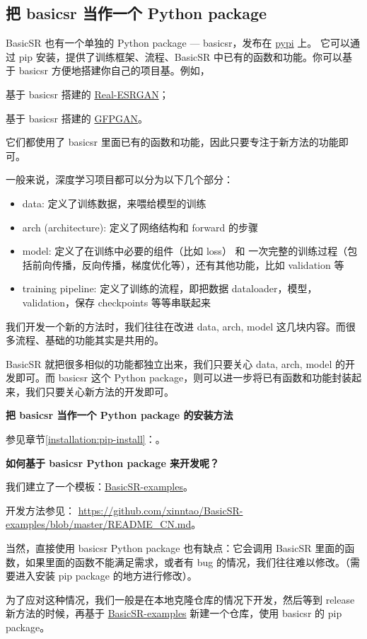 \documentclass[../main.tex]{subfiles}
\begin{document}
\subsection{把 basicsr 当作一个 Python package}\label{overview:package}

BasicSR 也有一个单独的 Python package --- basicsr，发布在 \href{https://pypi.org/project/basicsr}{pypi} 上。
它可以通过 pip 安装，提供了训练框架、流程、BasicSR 中已有的函数和功能。你可以基于 basicsr 方便地搭建你自己的项目基。例如，

\centerline{基于 basicsr 搭建的 \href{https://github.com/xinntao/Real-ESRGAN}{Real-ESRGAN}；}
\centerline{基于 basicsr 搭建的 \href{https://github.com/TencentARC/GFPGAN}{GFPGAN}。}

它们都使用了 basicsr 里面已有的函数和功能，因此只要专注于新方法的功能即可。

一般来说，深度学习项目都可以分为以下几个部分：
\begin{itemize}
    \item data: 定义了训练数据，来喂给模型的训练
    \item arch (architecture): 定义了网络结构和 forward 的步骤
    \item model: 定义了在训练中必要的组件（比如 loss） 和 一次完整的训练过程（包括前向传播，反向传播，梯度优化等），还有其他功能，比如 validation 等
    \item training pipeline: 定义了训练的流程，即把数据 dataloader，模型，validation，保存 checkpoints 等等串联起来
\end{itemize}

我们开发一个新的方法时，我们往往在改进 data, arch, model 这几块内容。而很多流程、基础的功能其实是共用的。

BasicSR 就把很多相似的功能都独立出来，我们只要关心 data, arch, model 的开发即可。而 basicsr 这个 Python package，则可以进一步将已有函数和功能封装起来，我们只要关心新方法的开发即可。

\begin{note} %
    \textbf{把 basicsr 当作一个 Python package 的安装方法}

    参见章节\ref{installation:pip-install}：。
\end{note}

\textbf{}

\begin{note} %
    \textbf{如何基于 basicsr Python package 来开发呢？}

    我们建立了一个模板：\href{https://github.com/xinntao/BasicSR-examples}{BasicSR-examples}。

    开发方法参见： \url{https://github.com/xinntao/BasicSR-examples/blob/master/README_CN.md}。
\end{note}

当然，直接使用 basicsr Python package 也有缺点：它会调用 BasicSR 里面的函数，如果里面的函数不能满足需求，或者有 bug 的情况，我们往往难以修改。（需要进入安装 pip package 的地方进行修改）。

为了应对这种情况，我们一般是在本地克隆仓库的情况下开发，然后等到 release 新方法的时候，再基于 \href{https://github.com/xinntao/BasicSR-examples}{BasicSR-examples} 新建一个仓库，使用 basicsr 的 pip package。
\end{document}
